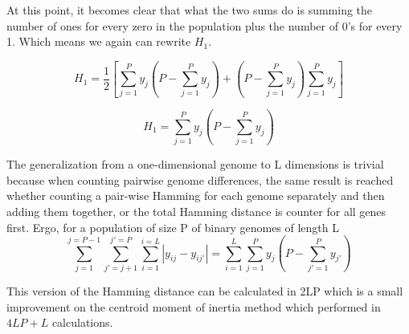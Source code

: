 At this point, it becomes clear that what the two sums do is summing the number of ones for every zero in the population plus the number of 0's for every 1. Which means we again can rewrite \(H_{1}\). 

\begin{equation*}
    H_{1} = \frac{1}{2}\left [\sum_{j=1}^{P}y_{j}\left (P - \sum_{j=1}^{P}y_{j} \right) + \left (P - \sum_{j=1}^{P}y_{j} \right)\sum_{j=1}^{P}y_{j}\right ]
\end{equation*}

\begin{equation}
    \label{eq:linearHamming}
    H_{1} = \sum_{j=1}^{P}y_{j}\left (P - \sum_{j=1}^{P}y_{j} \right)
\end{equation}

The generalization from a one-dimensional genome to L dimensions is trivial because when counting pairwise genome differences, the same result is reached whether counting a pair-wise Hamming for each genome separately and then adding them together, or the total Hamming distance is counter for all genes first. Ergo, for a population of size P of binary genomes of length L
\begin{equation}
    \label{eq:proved}
    \sum_{j=1}^{j=P-1}\sum_{{j}'=j+1}^{{j}'=P}\sum_{i=1}^{i=L}\left |y_{ij}-y_{i{j}'}\right | = \sum_{i=1}^{L}\sum_{j=1}^{P}y_{j}\left (P - \sum_{{j}'=1}^{P}y_{{j}'} \right)
\end{equation}

This version of the Hamming distance can be calculated in 2LP which is a small improvement on the centroid moment of inertia method which performed in \(4LP + L\) calculations. 


